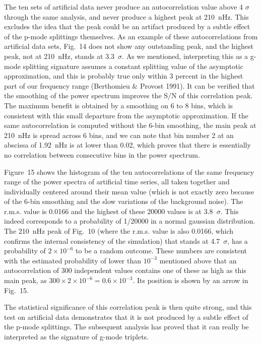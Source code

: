 \documentclass[bibyear]{aa}
\begin{document}
The ten sets of artificial data never produce an autocorrelation value above 4 $\sigma$ through the
same analysis, and never produce a highest peak at 210~nHz. This excludes the idea that the peak could be an artifact produced by a subtle effect of the p-mode splittings themselves.  As an example of these autocorrelations from artificial data sets, Fig.~14 does not show any outstanding peak, and the highest peak, not at 210~nHz,  stands at 3.3~$\sigma$. As we mentioned, interpreting
this as a g-mode splitting signature assumes a constant splitting value of the asymptotic approximation, and this is probably true only within 3 percent in the highest part of our frequency range (Berthomieu \& Provost 1991). It can be verified that the smoothing of the power spectrum improves the S/N of this correlation peak. The maximum benefit is obtained by a smoothing on 6 to 8 bins, which is consistent with this small departure from the asymptotic approximation.  If the same autocorrelation is computed without the 6-bin smoothing, the main peak at 210~nHz is spread across 6 bins, and we can note that bin number 2 at an abscissa of 1.92~nHz is at lower than 0.02, which proves that there is essentially no correlation between consecutive bins in the power spectrum.


Figure~15 shows the histogram of the ten autocorrelations of the same frequency range of the power spectra of artificial time series, all taken together and individually centered around their mean value (which is not exactly zero because of the 6-bin smoothing and the slow variations of the background noise). The r.m.s. value is 0.0166 and the highest of these 20000 values is at 3.8~$\sigma$.  This indeed corresponds to a probability of 1/20000 in a normal gaussian distribution. The 210~nHz peak of Fig.~10 (where the r.m.s. value is also 0.0166, which confirms the internal consistency of the simulation) that stands at 4.7~$\sigma$, has a probability of $2\times10^{-6}$ to be a random outcome. These numbers are consistent with the estimated probability of lower than $10^{-3}$ mentioned above that an autocorrelation of 300 independent values contains one of these as high as this main peak, as $300\times 2\times 10^{-6} = 0.6\times 10^{-3}$. Its position is shown by an arrow in Fig.~15.


The statistical  significance of this correlation peak is then quite strong, and this test on artificial data demonstrates that it is not produced by a subtle effect of the p-mode splittings. The subsequent analysis has proved that it can really be interpreted as the signature of g-mode triplets. 
\end{document}
